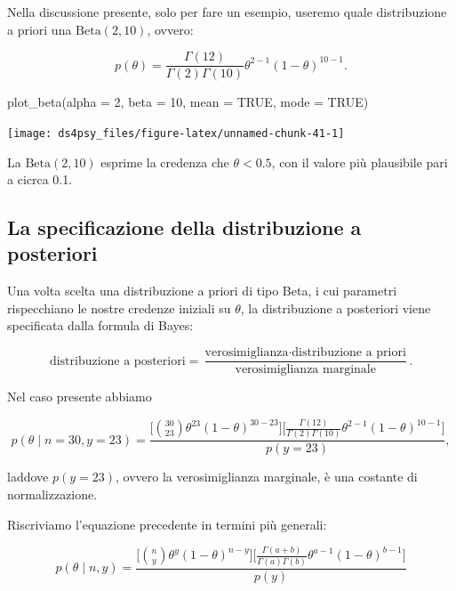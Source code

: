 \documentclass[
  11pt,
]{krantz}
\makeatletter
\newenvironment{Shaded}{\begin{snugshade}}{\end{snugshade}}
\newcommand{\AttributeTok}[1]{\textcolor[rgb]{0.61,0.61,0.61}{#1}}
\newcommand{\ConstantTok}[1]{\textcolor[rgb]{0,0,0}{#1}}
\newcommand{\DecValTok}[1]{\textcolor[rgb]{0.06,0.06,0.06}{#1}}
\newcommand{\FunctionTok}[1]{\textcolor[rgb]{0,0,0}{#1}}
\newcommand{\NormalTok}[1]{#1}
\newenvironment{kframe}{%
\medskip{}
\setlength{\fboxsep}{.8em}
 \def\at@end@of@kframe{}%
 \ifinner\ifhmode%
  \def\at@end@of@kframe{\end{minipage}}%
  \begin{minipage}{\columnwidth}%
 \fi\fi%
 \def\FrameCommand##1{\hskip\@totalleftmargin \hskip-\fboxsep
 \colorbox{shadecolor}{##1}\hskip-\fboxsep
     \hskip-\linewidth \hskip-\@totalleftmargin \hskip\columnwidth}%
 \MakeFramed {\advance\hsize-\width
   \@totalleftmargin\z@ \linewidth\hsize
   \@setminipage}}%
 {\par\unskip\endMakeFramed%
 \at@end@of@kframe}
\renewenvironment{Shaded}{\begin{kframe}}{\end{kframe}}
\theoremstyle{definition}
\theoremstyle{definition}
\theoremstyle{definition}
\theoremstyle{definition}
\theoremstyle{remark}
\makeatother
\begin{document}
Nella discussione presente, solo per fare un esempio, useremo quale distribuzione a priori una \(\mbox{Beta}(2, 10)\), ovvero:

\[
p(\theta) = \frac{\Gamma(12)}{\Gamma(2)\Gamma(10)}\theta^{2-1} (1-\theta)^{10-1}.
\]

\begin{Shaded}
\begin{Highlighting}[]
\FunctionTok{plot\_beta}\NormalTok{(}\AttributeTok{alpha =} \DecValTok{2}\NormalTok{, }\AttributeTok{beta =} \DecValTok{10}\NormalTok{, }\AttributeTok{mean =} \ConstantTok{TRUE}\NormalTok{, }\AttributeTok{mode =} \ConstantTok{TRUE}\NormalTok{)}
\end{Highlighting}
\end{Shaded}

\begin{center}\texttt{[image: ds4psy\_files/figure-latex/unnamed-chunk-41-1]} \end{center}

La \(\mbox{Beta}(2, 10)\) esprime la credenza che \(\theta < 0.5\), con il valore più plausibile pari a cicrca 0.1.

\hypertarget{la-specificazione-della-distribuzione-a-posteriori}{%
\subsection{La specificazione della distribuzione a posteriori}\label{la-specificazione-della-distribuzione-a-posteriori}}

Una volta scelta una distribuzione a priori di tipo Beta, i cui parametri rispecchiano le nostre credenze iniziali su \(\theta\), la distribuzione a posteriori viene specificata dalla formula di Bayes:

\[
\text{distribuzione a posteriori} = \frac{\text{verosimiglianza}\cdot\text{distribuzione a priori}}{\text{verosimiglianza marginale}}.
\]

Nel caso presente abbiamo

\[
p(\theta \mid n=30, y=23) = \frac{\Big[\binom{30}{23}\theta^{23}(1-\theta)^{30-23}\Big]\Big[\frac{\Gamma(12)}{\Gamma(2)\Gamma(10)}\theta^{2-1} (1-\theta)^{10-1}\Big]}{p(y = 23)},
\]

laddove \(p(y = 23)\), ovvero la verosimiglianza marginale, è una costante di normalizzazione.

Riscriviamo l'equazione precedente in termini più generali:

\[
p(\theta \mid n, y) = \frac{\Big[\binom{n}{y}\theta^{y}(1-\theta)^{n-y}\Big]\Big[\frac{\Gamma(a+b)}{\Gamma(a)\Gamma(b)}\theta^{a-1} (1-\theta)^{b-1}\Big]}{p(y)}
\]
\end{document}
